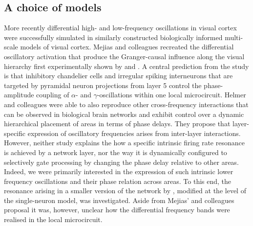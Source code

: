 \subsection{A choice of models}
More recently differential high- and low-frequency oscillations in visual cortex were successfully simulated \citep{Helmer2015, Mejias} in similarly constructed biologically informed multi-scale models of visual cortex. 
Mejias and colleagues recreated the differential oscillatory activation that produce the Granger-causal influence along the visual hierarchy first experimentally shown by \citet{VanKerkoerle} and \citet{AndreMoraesBastos2015}. A central prediction from the study is that inhibitory chandelier cells and irregular spiking interneurons that are targeted by pyramidal neuron projections from layer 5 control the phase-amplitude coupling of $\alpha$- and $\gamma$-oscillations within one local microcircuit.
Helmer and colleagues were able to also reproduce other cross-frequency interactions that can be observed in biological brain networks and exhibit control over a dynamic hierarchical placement of areas in terms of phase delays. They propose that layer-specific expression of oscillatory frequencies arises from inter-layer interactions. 
However, neither study explains the how a specific intrinsic firing rate resonance is achieved by a network layer, nor the way it is dynamically configured to selectively gate processing by changing the phase delay relative to other areas. 
Indeed, we were primarily interested in the expression of such intrinsic lower frequency oscillations and their phase relation across areas.
To this end, the resonance arising in a smaller version of the network by \citet{Schmidt2015a}, modified at the level of the single-neuron model, was investigated. 
Aside from Mejias' and colleagues proposal it was, however, unclear how the differential frequency bands were realised in the local microcircuit.

